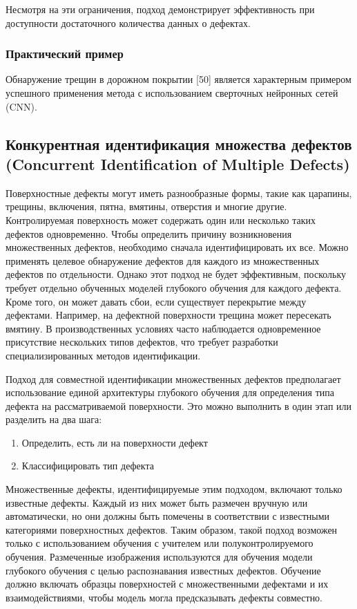 \documentclass[14pt,a4paper]{article}
\begin{document}
Несмотря на эти ограничения, подход демонстрирует эффективность при доступности достаточного количества данных о дефектах.

\subsubsection{Практический пример}
Обнаружение трещин в дорожном покрытии [50] является характерным примером успешного применения метода с использованием сверточных нейронных сетей (CNN). \cite{Bhatt2021}

\subsection{Конкурентная идентификация множества дефектов (Concurrent Identification of Multiple Defects)}

Поверхностные дефекты могут иметь разнообразные формы, такие как царапины, трещины, включения, пятна, вмятины, отверстия и многие другие. Контролируемая поверхность может содержать один или несколько таких дефектов одновременно. Чтобы определить причину возникновения множественных дефектов, необходимо сначала идентифицировать их все. Можно применять целевое обнаружение дефектов для каждого из множественных дефектов по отдельности. Однако этот подход не будет эффективным, поскольку требует отдельно обученных моделей глубокого обучения для каждого дефекта. Кроме того, он может давать сбои, если существует перекрытие между дефектами. Например, на дефектной поверхности трещина может пересекать вмятину. В производственных условиях часто наблюдается одновременное присутствие нескольких типов дефектов, что требует разработки специализированных методов идентификации.

Подход для совместной идентификации множественных дефектов предполагает использование единой архитектуры глубокого обучения для определения типа дефекта на рассматриваемой поверхности. Это можно выполнить в один этап или разделить на два шага: 
\begin{enumerate}
	\item Определить, есть ли на поверхности дефект
	\item Классифицировать тип дефекта
\end{enumerate}
Множественные дефекты, идентифицируемые этим подходом, включают только известные дефекты. Каждый из них может быть размечен вручную или автоматически, но они должны быть помечены в соответствии с известными категориями поверхностных дефектов. Таким образом, такой подход возможен только с использованием обучения с учителем или полуконтролируемого обучения. Размеченные изображения используются для обучения модели глубокого обучения с целью распознавания известных дефектов. Обучение должно включать образцы поверхностей с множественными дефектами и их взаимодействиями, чтобы модель могла предсказывать дефекты совместно.
\end{document}
